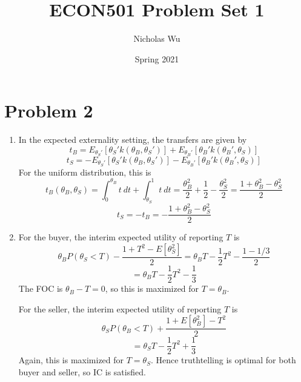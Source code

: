 \documentclass[10pt,letter]{article}
\begin{document}


\title{ECON501 Problem Set 1}

\author{Nicholas Wu}

\date{Spring 2021}

\maketitle

\section*{Problem 2}
\begin{enumerate}[label=(\alph*)]
  \item In the expected externality setting, the transfers are given by
  \[ t_B = E_{\theta_S'}[\theta_{S}' k(\theta_B, \theta_S')] + E_{\theta_B'}[\theta_{B}' k(\theta_B', \theta_S)] \]
  \[ t_S = -E_{\theta_S'}[\theta_{S}' k(\theta_B, \theta_S')] - E_{\theta_B'}[\theta_{B}' k(\theta_B', \theta_S)] \]
  For the uniform distribution, this is
  \[ t_B(\theta_B, \theta_S) = \int_{0}^{\theta_B }t \ dt + \int_{\theta_S}^1 t \ dt = \frac{\theta_B^2}{2} + \frac{1}{2} - \frac{\theta_S^2}{2} = \frac{1 + \theta_B^2 - \theta_S^2}{2} \]
  \[ t_S = -t_B = -\frac{1 + \theta_B^2 - \theta_S^2}{2} \]
  \item For the buyer, the interim expected utility of reporting $T$ is
  \[ \theta_B P(\theta_S < T) - \frac{1 + T^2 - E[\theta_S^2]}{2} = \theta_B T - \frac{1}{2}T^2 - \frac{1 - 1/3}{2}  \]
  \[ = \theta_B T - \frac{1}{2}T^2 - \frac{1}{3} \]
  The FOC is $\theta_B - T = 0$, so this is maximized for $T = \theta_B $.

  For the seller, the interim expected utility of reporting $T$ is
  \[ \theta_S P(\theta_B < T) +  \frac{1 + E[\theta_B^2] - T^2}{2} \]
  \[ = \theta_S T - \frac{1}{2}T^2 +  \frac{1}{3} \]
  Again, this is maximized for $T = \theta_S$. Hence truthtelling is optimal for both buyer and seller, so IC is satisfied.
\end{enumerate}
\end{document}
